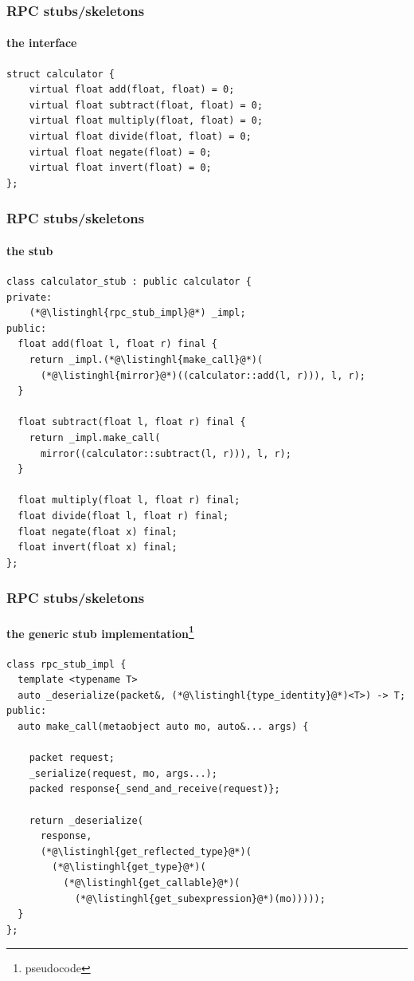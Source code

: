 \documentclass[compress,table,xcolor=table]{beamer}
\begin{document}
\begin{frame}[fragile]
  \frametitle{RPC stubs/skeletons}
  \framesubtitle{the interface}
  \begin{lstlisting}[language=c++2x,basicstyle=\small\ttfamily]
struct calculator {
    virtual float add(float, float) = 0;
    virtual float subtract(float, float) = 0;
    virtual float multiply(float, float) = 0;
    virtual float divide(float, float) = 0;
    virtual float negate(float) = 0;
    virtual float invert(float) = 0;
};
  \end{lstlisting}
\end{frame}
\begin{frame}[fragile]
  \frametitle{RPC stubs/skeletons}
  \framesubtitle{the stub}
  \begin{lstlisting}[language=c++2x,basicstyle=\footnotesize\ttfamily]
class calculator_stub : public calculator {
private:
    (*@\listinghl{rpc_stub_impl}@*) _impl;
public:
  float add(float l, float r) final {
    return _impl.(*@\listinghl{make_call}@*)(
      (*@\listinghl{mirror}@*)((calculator::add(l, r))), l, r);
  }

  float subtract(float l, float r) final {
    return _impl.make_call(
      mirror((calculator::subtract(l, r))), l, r);
  }

  float multiply(float l, float r) final;
  float divide(float l, float r) final;
  float negate(float x) final;
  float invert(float x) final;
};
  \end{lstlisting}
\end{frame}
\begin{frame}[fragile]
  \frametitle{RPC stubs/skeletons}
  \framesubtitle{the generic stub implementation\footnote{pseudocode}}
  \begin{lstlisting}[language=c++2x,basicstyle=\footnotesize\ttfamily]
class rpc_stub_impl {
  template <typename T>
  auto _deserialize(packet&, (*@\listinghl{type_identity}@*)<T>) -> T;
public:
  auto make_call(metaobject auto mo, auto&... args) {

    packet request;
    _serialize(request, mo, args...);
    packed response{_send_and_receive(request)};

    return _deserialize(
      response,
      (*@\listinghl{get_reflected_type}@*)(
        (*@\listinghl{get_type}@*)(
          (*@\listinghl{get_callable}@*)(
            (*@\listinghl{get_subexpression}@*)(mo)))));
  }
};
  \end{lstlisting}
\end{frame}
\end{document}
